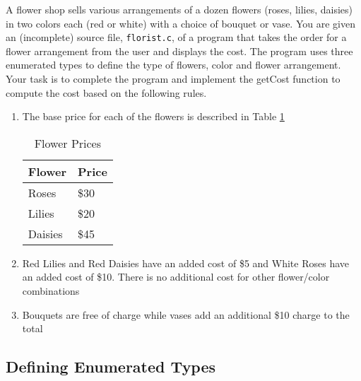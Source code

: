 \documentclass[12pt]{scrartcl}
\begin{document}
A flower shop sells various arrangements of a dozen flowers 
(roses, lilies, daisies) in two colors each (red or white) with a 
choice of bouquet or vase.  You are given an (incomplete) source 
file, \texttt{florist.c}, of a program that takes the order 
for a flower arrangement from the user and displays the cost. 
The program uses three enumerated types to define the type 
of flowers, color and flower arrangement.  Your task is to 
complete the program and implement the getCost function to 
compute the cost based on the following rules.
\begin{enumerate}
  \item The base price for each of the flowers is described in Table \ref{table:basePrice}
  \begin{table}[h]
  \centering
  \begin{tabular}{l|l}
  Flower & Price\\
  \hline\hline
  Roses & \$30 \\
  Lilies	 & \$20 \\
  Daisies & \$45 \\
  \end{tabular}
  \caption{Flower Prices}
  \label{table:basePrice}
  \end{table}
  \item Red Lilies and Red Daisies have an added cost of \$5 and White 
  	Roses have an added cost of \$10.  There is no additional cost for 
	other flower/color combinations
  \item Bouquets are free of charge while vases add an additional \$10 charge to the total
\end{enumerate}
	
\subsection{Defining Enumerated Types}
\end{document}
